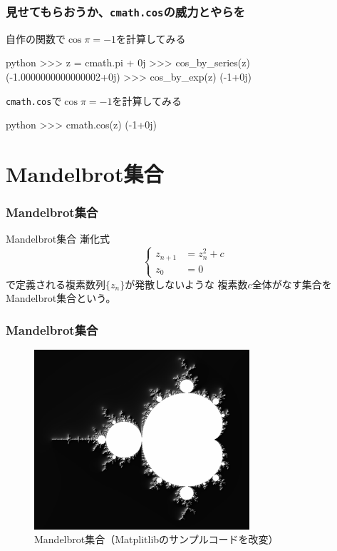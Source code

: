 \documentclass[dvipdfmx,11pt,notheorems]{beamer}
\theoremstyle{definition}
\begin{document}
\begin{frame}[fragile]\frametitle{見せてもらおうか、\texttt{cmath.cos}の威力とやらを}
\begin{exampleblock}{自作の関数で$\cos{\pi} = -1$を計算してみる}
\begin{pygments}{python}
>>> z = cmath.pi + 0j
>>> cos_by_series(z)
(-1.0000000000000002+0j)
>>> cos_by_exp(z)
(-1+0j)
\end{pygments}
\end{exampleblock}

\begin{exampleblock}{\texttt{cmath.cos}で$\cos{\pi} = -1$を計算してみる}
\begin{pygments}{python}
>>> cmath.cos(z)
(-1+0j)
\end{pygments}
\end{exampleblock}

\end{frame}

\section{Mandelbrot集合}

\begin{frame}[fragile]\frametitle{Mandelbrot集合}

\begin{block}{Mandelbrot集合}
漸化式
\begin{equation*}
    \left\{
    \begin{alignedat}{4}
          z_{n+1} &= z^{2}_{n} +c \\
          z_{0} &= 0
    \end{alignedat}
    \right.
\end{equation*}
で定義される複素数列$\{z_{n}\}$が発散しないような
複素数$c$全体がなす集合をMandelbrot集合という。
\end{block}

\end{frame}

\begin{frame}[fragile]\frametitle{Mandelbrot集合}

\begin{figure}
  \centering
  \includegraphics[width=8cm]{mandelbrot.png}
  \caption{Mandelbrot集合（Matplitlibのサンプルコードを改変）}
\end{figure}

\end{frame}
\end{document}
